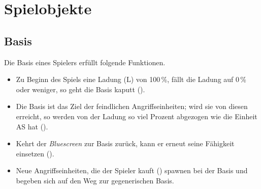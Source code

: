 \section{Spielobjekte}

%
%









\subsection{Basis}

Die Basis eines Spielers erfüllt folgende Funktionen.

\begin{itemize}
  \item Zu Beginn des Spiels eine Ladung (L) von 100\,\%, fällt die Ladung auf
    0\,\% oder weniger, so geht die Basis kaputt ().

  \item Die Basis ist das Ziel der feindlichen Angriffseinheiten; wird sie von
    diesen erreicht, so werden von der Ladung so viel Prozent abgezogen wie die
    Einheit AS hat ().

  \item Kehrt der \emph{Bluescreen} zur Basis zurück, kann er erneut seine
    Fähigkeit einsetzen ().

  \item Neue Angriffseinheiten, die der Spieler kauft ()
    spawnen bei der Basis und begeben sich auf den Weg zur gegenerischen Basis.

\end{itemize}
